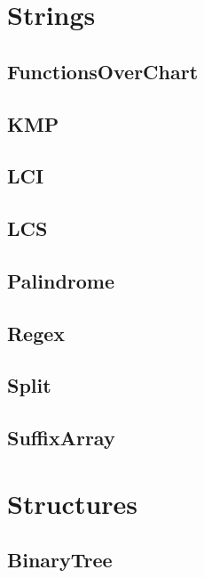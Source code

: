 \section{Strings}
\subsection{ FunctionsOverChart}
\raggedbottom
\hrulefill
\subsection{ KMP}
\raggedbottom
\hrulefill
\subsection{ LCI}
\raggedbottom
\hrulefill
\subsection{ LCS}
\raggedbottom
\hrulefill
\subsection{ Palindrome}
\raggedbottom
\hrulefill
\subsection{ Regex}
\raggedbottom
\hrulefill
\subsection{ Split}
\raggedbottom
\hrulefill
\subsection{ SuffixArray}
\raggedbottom
\hrulefill

\section{Structures}
\subsection{ BinaryTree}
\raggedbottom
\hrulefill
